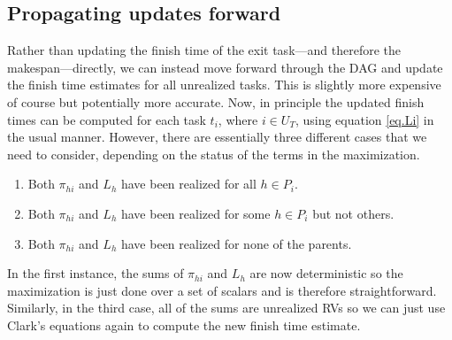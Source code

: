 \documentclass[12pt]{article}
\begin{document}
\subsection{Propagating updates forward}
\label{subsect.propagating}

Rather than updating the finish time of the exit task---and therefore the makespan---directly, we can instead move forward through the DAG and update the finish time estimates for all unrealized tasks. This is slightly more expensive of course but potentially more accurate. Now, in principle the updated finish times can be computed for each task $t_i$, where $i \in U_T$, using equation \eqref{eq.Li} in the usual manner. However, there are essentially three different cases that we need to consider, depending on the status of the terms in the maximization.
\begin{enumerate}
\item Both $\pi_{hi}$ and $L_h$ have been realized for all $h \in P_i$.
\item Both $\pi_{hi}$ and $L_h$ have been realized for some $h \in P_i$ but not others. 
  \item Both $\pi_{hi}$ and $L_h$ have been realized for none of the parents.
  \end{enumerate}
  In the first instance, the sums of $\pi_{hi}$ and $L_h$ are now deterministic so the maximization is just done over a set of scalars and is therefore straightforward. Similarly, in the third case, all of the sums are unrealized RVs so we can just use Clark's equations again to compute the new finish time estimate.
\end{document}
